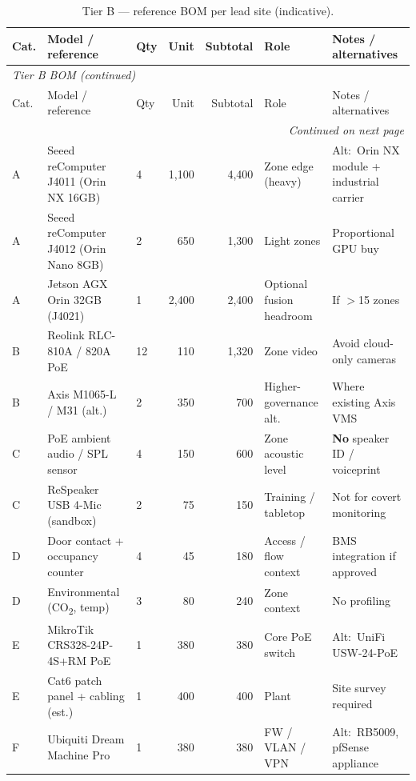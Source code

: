 \begin{longtable}{@{}p{0.7cm}p{2.4cm}p{2.6cm}r r p{2.2cm}p{2.5cm}@{}}
  \caption{Tier B --- reference BOM per lead site (indicative).}
  \label{tab:bom-tier-b} \\
  \toprule
  Cat. & Model / reference & Qty & Unit & Subtotal & Role & Notes / alternatives \\
  \midrule
  \endfirsthead
  \multicolumn{7}{l}{\textit{Tier B BOM (continued)}} \\
  \toprule
  Cat. & Model / reference & Qty & Unit & Subtotal & Role & Notes / alternatives \\
  \midrule
  \endhead
  \midrule
  \multicolumn{7}{r}{\textit{Continued on next page}} \\
  \endfoot
  \bottomrule
  \endlastfoot
  A & Seeed reComputer J4011 (Orin NX 16GB) & 4 & 1{,}100 & 4{,}400 &
    Zone edge (heavy) & Alt:\ Orin NX module + industrial carrier \\
  A & Seeed reComputer J4012 (Orin Nano 8GB) & 2 & 650 & 1{,}300 &
    Light zones & Proportional GPU buy \\
  A & Jetson AGX Orin 32GB (J4021) & 1 & 2{,}400 & 2{,}400 &
    Optional fusion headroom & If $>$15 zones \\
  B & Reolink RLC-810A / 820A PoE & 12 & 110 & 1{,}320 &
    Zone video & Avoid cloud-only cameras \\
  B & Axis M1065-L / M31 (alt.) & 2 & 350 & 700 &
    Higher-governance alt. & Where existing Axis VMS \\
  C & PoE ambient audio / SPL sensor & 4 & 150 & 600 &
    Zone acoustic level & \textbf{No} speaker ID / voiceprint \\
  C & ReSpeaker USB 4-Mic (sandbox) & 2 & 75 & 150 &
    Training / tabletop & Not for covert monitoring \\
  D & Door contact + occupancy counter & 4 & 45 & 180 &
    Access / flow context & BMS integration if approved \\
  D & Environmental (CO\textsubscript{2}, temp) & 3 & 80 & 240 &
    Zone context & No profiling \\
  E & MikroTik CRS328-24P-4S+RM PoE & 1 & 380 & 380 &
    Core PoE switch & Alt:\ UniFi USW-24-PoE \\
  E & Cat6 patch panel + cabling (est.) & 1 & 400 & 400 &
    Plant & Site survey required \\
  F & Ubiquiti Dream Machine Pro & 1 & 380 & 380 &
    FW / VLAN / VPN & Alt:\ RB5009, pfSense appliance \\

\end{longtable}
